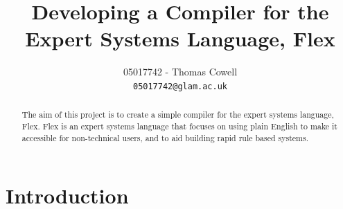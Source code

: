 \documentclass[12pt]{report}
\begin{document}
\title{Developing a Compiler for the Expert Systems Language, Flex}
\author{05017742 - Thomas Cowell\\
		\texttt{05017742@glam.ac.uk}}

\maketitle

\begin{abstract}
The aim of this project is to create a simple compiler for the expert systems language, Flex.  Flex is an expert systems language that focuses on using plain English to make it accessible for non-technical users, and to aid building rapid rule based systems.
\end{abstract}

\pagestyle{plain}

\tableofcontents

\cleardoublepage
{}

\chapter{Introduction}
\end{document}
